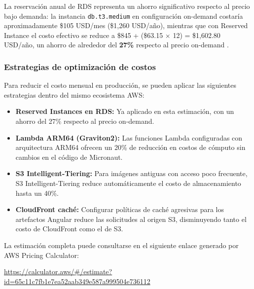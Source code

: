La reservación anual de RDS representa un ahorro significativo respecto
al precio bajo demanda: la instancia \texttt{db.t3.medium} en
configuración on-demand costaría aproximadamente \$105 USD/mes
(\$1,260 USD/año), mientras que con Reserved Instance el costo
efectivo se reduce a \$845 + (\$63.15 $\times$ 12) = \$1,602.80
USD/año, un ahorro de alrededor del \textbf{27\%} respecto al precio
on-demand \cite{aws_rds_pricing}.

\subsubsection*{Estrategias de optimización de costos}

Para reducir el costo mensual en producción, se pueden aplicar las
siguientes estrategias dentro del mismo ecosistema AWS:

\begin{itemize}
    \item \textbf{Reserved Instances en RDS:} Ya aplicado en esta
    estimación, con un ahorro del 27\% respecto al precio on-demand.
    \item \textbf{Lambda ARM64 (Graviton2):} Las funciones Lambda
    configuradas con arquitectura ARM64 ofrecen un 20\% de reducción
    en costos de cómputo sin cambios en el código de Micronaut.
    \item \textbf{S3 Intelligent-Tiering:} Para imágenes antiguas
    con acceso poco frecuente, S3 Intelligent-Tiering reduce
    automáticamente el costo de almacenamiento hasta un 40\%.
    \item \textbf{CloudFront caché:} Configurar políticas de caché
    agresivas para los artefactos Angular reduce las solicitudes
    al origen S3, disminuyendo tanto el costo de CloudFront como
    el de S3.
\end{itemize}

La estimación completa puede consultarse en el siguiente enlace
generado por AWS Pricing Calculator:

\begin{center}
\url{https://calculator.aws/#/estimate?id=65c11c7fb1e7ea52aab349e587a999504e736112}
\end{center}
\cite{aws_calculator}